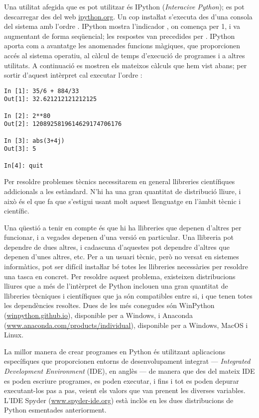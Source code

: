 Una utilitat afegida que es pot utilitzar és IPython (\textit{Interacive Python}); es pot descarregar des del web \href{https://ipython.org/}{ipython.org}. Un cop instaŀlat s'executa des d'una consola del sistema amb l'ordre . IPython mostra l'indicador , on  comença per 1, i va augmentant de forma seqüencial; les respostes van precedides per . IPython aporta com a avantatge les anomenades funcions màgiques, que proporcionen accés al sistema operatiu, al càlcul de temps d'execució de programes i a altres utilitats. A continuació es mostren els mateixos càlculs que hem vist abans; per sortir d'aquest intèrpret cal executar l'ordre :
\begin{lstlisting}
In [1]: 35/6 + 884/33
Out[1]: 32.621212121212125

In [2]: 2**80
Out[2]: 1208925819614629174706176

In [3]: abs(3+4j)
Out[3]: 5

In[4]: quit
\end{lstlisting}

Per resoldre problemes tècnics necessitarem en general llibreries científiques addicionals a les estàndard. N'hi ha una gran quantitat de distribució lliure, i  això és el que fa que s'estigui usant molt aquest llenguatge en l'àmbit tècnic i científic.

Una qüestió a tenir en compte és que hi ha llibreries que depenen d'altres per funcionar, i a vegades  depenen d'una versió en particular. Una llibreria pot dependre de dues altres, i cadascuna d'aquestes pot dependre d'altres que depenen d'unes altres, etc. Per a un usuari tècnic, però no versat en sistemes informàtics, pot ser difícil instaŀlar bé totes les llibreries necessàries per resoldre una tasca en concret. Per resoldre aquest problema, existeixen distribucions lliures que a més de l'intèrpret de Python inclouen una gran quantitat de llibreries tècniques i científiques que ja són compatibles entre si, i que tenen totes les dependències resoltes. Dues de les més conegudes són WinPython (\href{https://winpython.github.io/}{winpython.github.io}), disponible  per a Windows, i
Anaconda (\href{https://www.anaconda.com/products/individual}{www.anaconda.com/products/individual}), disponible per a Windows, MacOS i Linux.



La millor manera de crear programes en Python és utilitzant aplicacions específiques que proporcionen entorns  de desenvolupament integrat --- \textit{Integrated Development Environment} (IDE), en anglès --- de manera que des del mateix IDE es poden escriure programes, es poden executar, i fins i tot es poden depurar executant-los pas a pas, veient els valors que van prenent les diverses variables. L'IDE Spyder (\href{https://www.spyder-ide.org/}{www.spyder-ide.org}) està inclòs en les dues distribucions de Python esmentades anteriorment. 

